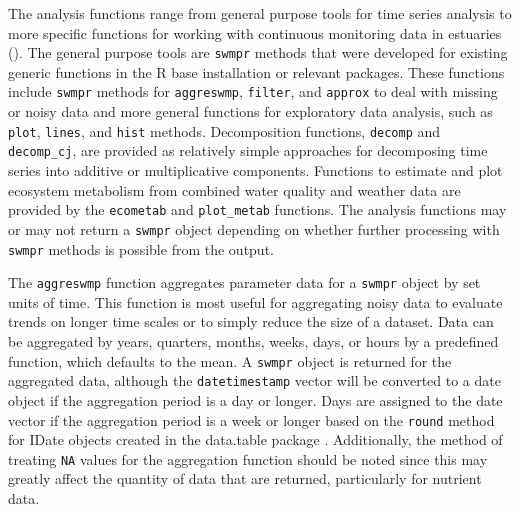 \documentclass[10pt,letterpaper]{article}\usepackage[]{graphicx}\usepackage[]{color}
\begin{document}
The analysis functions range from general purpose tools for time series analysis to more specific functions for working with continuous monitoring data in estuaries ().  The general purpose tools are \texttt{swmpr} methods that were developed for existing generic functions in the R base installation or relevant packages.  These functions include \texttt{swmpr} methods for \texttt{aggreswmp}, \texttt{filter}, and \texttt{approx} to deal with missing or noisy data and more general functions for exploratory data analysis, such as \texttt{plot}, \texttt{lines}, and \texttt{hist} methods.  Decomposition functions, \texttt{decomp} and \texttt{decomp\_cj}, are provided as relatively simple approaches for decomposing time series into additive or multiplicative components. Functions to estimate and plot ecosystem metabolism from combined water quality and weather data are provided by the \texttt{ecometab} and \texttt{plot\_metab} functions.  The analysis functions may or may not return a \texttt{swmpr} object depending on whether further processing with \texttt{swmpr} methods is possible from the output.    

The \texttt{aggreswmp} function aggregates parameter data for a \texttt{swmpr} object by set units of time.  This function is most useful for aggregating noisy data to evaluate trends on longer time scales or to simply reduce the size of a dataset.  Data can be aggregated by years, quarters, months, weeks, days, or hours by a predefined function, which defaults to the mean.  A \texttt{swmpr} object is returned for the aggregated data, although the \texttt{datetimestamp} vector will be converted to a date object if the aggregation period is a day or longer.  Days are assigned to the date vector if the aggregation period is a week or longer based on the \texttt{round} method for IDate objects created in the data.table package \cite{Dowle14}.  Additionally, the method of treating \texttt{NA} values for the aggregation function should be noted since this may greatly affect the quantity of data that are returned, particularly for nutrient data.
\end{document}

